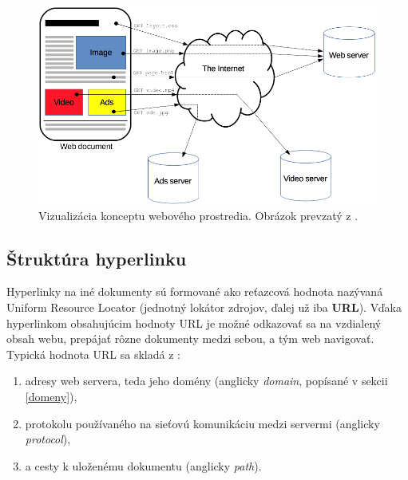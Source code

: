 \begin{figure}[htb]
\begin{center}
 \includegraphics[scale=0.55]{obrazky-figures/fetching_a_page.png}
 \caption{Vizualizácia konceptu webového prostredia. Obrázok prevzatý z \cite{mdn-docs-http-overview}.}
 \label{img:fetching-a-page}
\end{center}
\end{figure}


\pagebreak

\subsection{Štruktúra hyperlinku}
\label{navigacia-na-webe}

Hyperlinky na iné dokumenty sú formované ako reťazcová hodnota nazývaná Uniform Resource Locator \cite{wiki-hyperlink} (jednotný lokátor zdrojov, ďalej už iba \textbf{URL}).
Vďaka hyperlinkom obsahujúcim hodnoty URL je možné odkazovať sa na vzdialený obsah webu, prepájať rôzne dokumenty medzi sebou, a tým web navigovať.
Typická hodnota URL sa skladá z \cite{mdn-docs-url}:
\begin{enumerate}
    \item adresy web servera, teda jeho domény (anglicky \textit{domain}, popísané v sekcii \ref{domeny}),
    
    \item protokolu používaného na sieťovú komunikáciu medzi servermi (anglicky \textit{protocol}),
    
    \item a cesty k uloženému dokumentu (anglicky \textit{path}).
\end{enumerate}

